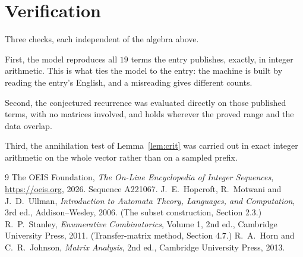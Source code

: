 \documentclass[11pt,a4paper]{article}
\theoremstyle{plain}
\theoremstyle{definition}
\begin{document}
\section{Verification}

Three checks, each independent of the algebra above.

First, the model reproduces all $19$ terms the entry publishes, exactly, in integer
arithmetic. This is what ties the model to the entry: the machine is built by reading the
entry's English, and a misreading gives different counts.

Second, the conjectured recurrence was evaluated directly on those published terms, with no
matrices involved, and holds wherever the proved range and the data overlap.

Third, the annihilation test of Lemma~\ref{lem:crit} was carried out in exact integer
arithmetic on the whole vector rather than on a sampled prefix.

\begin{thebibliography}{9}
 The OEIS Foundation, \emph{The On-Line Encyclopedia of Integer
Sequences}, \url{https://oeis.org}, 2026. Sequence A221067.
 J.~E.~Hopcroft, R.~Motwani and J.~D.~Ullman, \emph{Introduction to Automata
Theory, Languages, and Computation}, 3rd ed., Addison--Wesley, 2006. (The subset
construction, Section 2.3.)
 R.~P.~Stanley, \emph{Enumerative Combinatorics}, Volume 1, 2nd ed.,
Cambridge University Press, 2011. (Transfer-matrix method, Section 4.7.)
 R.~A.~Horn and C.~R.~Johnson, \emph{Matrix Analysis}, 2nd ed., Cambridge
University Press, 2013.
\end{thebibliography}
\end{document}
